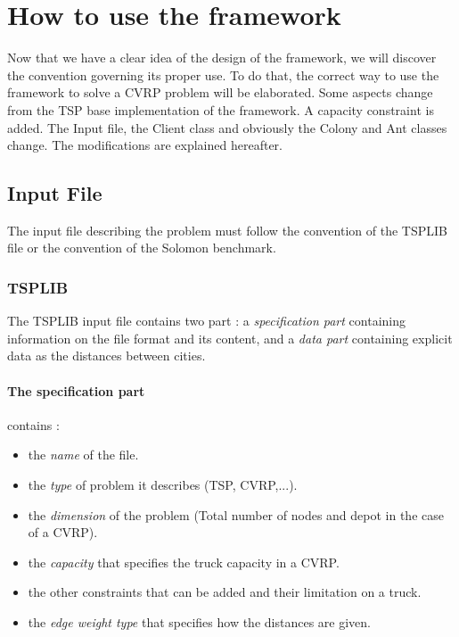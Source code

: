 \section{How to use the framework}\label{howtoframework}
Now that we have a clear idea of the design of the framework, we will discover the convention governing its proper use. To do that, the correct way to use the framework to solve a CVRP problem will be elaborated. Some aspects change from the TSP base implementation of the framework. A capacity constraint is added. The Input file, the Client class and obviously the Colony and Ant classes change. The modifications are explained hereafter. 

\subsection{Input File}
The input file describing the problem must follow the convention of the TSPLIB file or the convention of the Solomon benchmark.
\subsubsection{TSPLIB}
The TSPLIB input file contains two part : a \emph{specification part} containing information on the file format and its content, and a \emph{data part} containing explicit data as the distances between cities. \cite{tsplib}
\paragraph{The specification part} contains :
\begin{itemize}
	\item the \emph{name} of the file.
	\item the \emph{type} of problem it describes (TSP, CVRP,...).
	\item the \emph{dimension} of the problem (Total number of nodes and depot in the case of a CVRP).
	\item the \emph{capacity} that specifies the truck capacity in a CVRP.
	\item the other constraints that can be added and their limitation on a truck.
	\item the \emph{edge weight type} that specifies how the distances are given.
\end{itemize}
